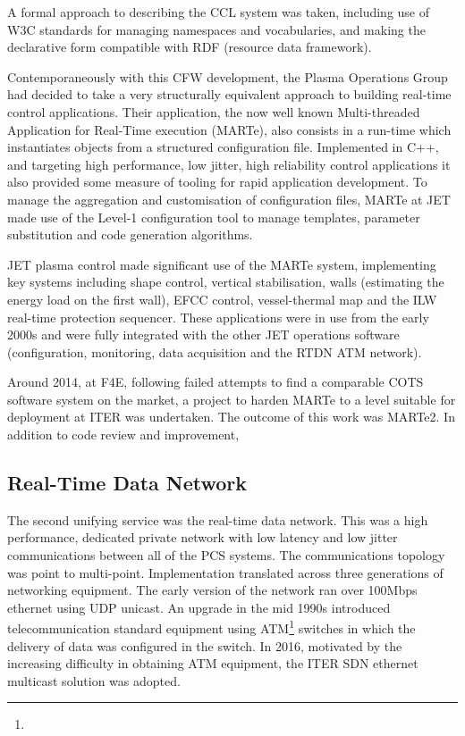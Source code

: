 \documentclass[preprint,12pt]{elsarticle}
\begin{document}
A formal approach to describing the CCL system was taken, including use of W3C
standards for managing namespaces and vocabularies, and making the declarative
form compatible with RDF (resource data framework).

Contemporaneously with this CFW development, the Plasma Operations Group had decided
to take a very structurally equivalent approach to building real-time control applications.
Their application, the now well known Multi-threaded Application for Real-Time execution (MARTe),
also consists in a run-time which instantiates objects from a structured configuration file.
Implemented in C++, and targeting high performance, low jitter, high reliability control
applications it also provided some measure of tooling for rapid application development.
To manage the aggregation and customisation of configuration files, MARTe at JET made
use of the Level-1 configuration tool to manage templates, parameter substitution and
code generation algorithms.

JET plasma control made significant use of the MARTe system, implementing key systems
including shape control, vertical stabilisation, walls (estimating the energy load on the first wall),
EFCC control, vessel-thermal map and the ILW real-time protection sequencer.  These applications
were in use from the early 2000s and were fully integrated with the other JET operations software
(configuration, monitoring, data acquisition and the RTDN ATM network).

Around 2014, at F4E, following failed attempts to find a comparable COTS software system 
on the market, a project to harden MARTe to a level suitable for deployment at ITER 
was undertaken.  The outcome of this work was MARTe2.  In addition to code review and improvement,


\subsection{Real-Time Data Network}

The second unifying service was the real-time data network. This was a high performance, dedicated private network with low latency and low jitter communications between all of the PCS systems.  The communications topology was point to multi-point. Implementation translated across three generations of networking equipment.  The early version of the network ran over 100Mbps ethernet using UDP unicast. An upgrade in the mid 1990s introduced telecommunication standard equipment using ATM\footnote{} switches in which the delivery of data was configured in the switch. In 2016, motivated by the increasing difficulty in obtaining ATM equipment, the ITER SDN ethernet multicast solution was adopted.
\end{document}
